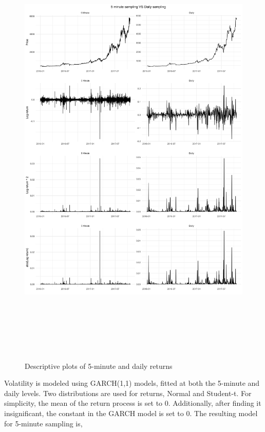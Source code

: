 \documentclass[10pt,twoside,printwatermark=false]{pinp}
\begin{document}
\begin{figure}
  \begin{center}
    \includegraphics[width=1.00\textwidth, height=8.5in]{../../visualizations/returns} 
  \end{center}
  \caption{Descriptive plots of 5-minute and daily returns}\label{fig}
\end{figure}

Volatility is modeled using GARCH(1,1) models, fitted at both the
5-minute and daily levels. Two distributions are used for returns,
Normal and Student-t. For simplicity, the mean of the return process is
set to 0. Additionally, after finding it insignificant, the constant in
the GARCH model is set to 0. The resulting model for 5-minute sampling
is,
\end{document}
